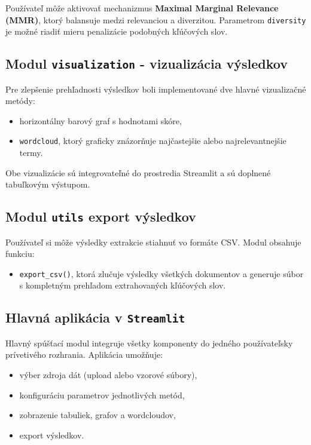 \documentclass[a4paper,12pt]{article}
\begin{document}
Používateľ môže aktivovať mechanizmus \textbf{Maximal Marginal Relevance (MMR)}, ktorý balansuje medzi relevanciou a diverzitou. Parametrom \texttt{diversity} je možné riadiť mieru penalizácie podobných kľúčových slov.

\subsection{Modul \texttt{visualization} - vizualizácia výsledkov}

Pre zlepšenie prehľadnosti výsledkov boli implementované dve hlavné vizualizačné metódy:
\begin{itemize}
    \item horizontálny barový graf s hodnotami skóre,
    \item \texttt{wordcloud}, ktorý graficky znázorňuje najčastejšie alebo najrelevantnejšie termy.
\end{itemize}

Obe vizualizácie sú integrovateľné do prostredia Streamlit a sú doplnené tabuľkovým výstupom.

\subsection{Modul \texttt{utils}  export výsledkov}

Používateľ si môže výsledky extrakcie stiahnuť vo formáte CSV. Modul obsahuje funkciu:
\begin{itemize}
    \item \texttt{export\_csv()}, ktorá zlučuje výsledky všetkých dokumentov a generuje súbor s kompletným prehľadom extrahovaných kľúčových slov.
\end{itemize}

\subsection{Hlavná aplikácia v \texttt{Streamlit}}

Hlavný spúšťací modul integruje všetky komponenty do jedného používateľsky prívetivého rozhrania. Aplikácia umožňuje:
\begin{itemize}
    \item výber zdroja dát (upload alebo vzorové súbory),
    \item konfiguráciu parametrov jednotlivých metód,
    \item zobrazenie tabuliek, grafov a wordcloudov,
    \item export výsledkov.
\end{itemize}
\end{document}
